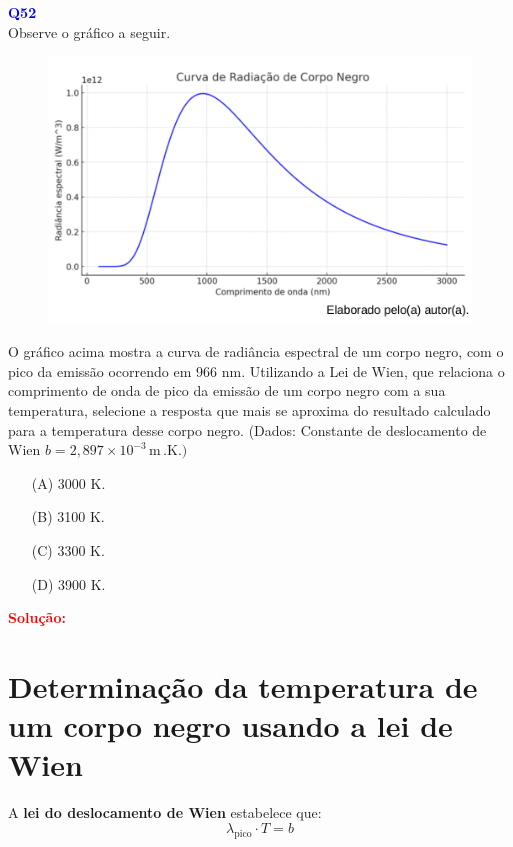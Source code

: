 \documentclass[a4paper,12pt]{article}
\begin{document}
\begin{flushleft}
\textbf{\textcolor{blue}{\Large Q52}}\\
\noindent
Observe o gráfico a seguir.

\begin{figure}[h]
\centering
\includegraphics[scale=0.5]{figures/radiacaocorponegro.png}
\end{figure}

O gráfico acima mostra a curva de radiância espectral de um
corpo negro, com o pico da emissão ocorrendo em 966 nm.
Utilizando a Lei de Wien, que relaciona o comprimento de
onda de pico da emissão de um corpo negro com a sua
temperatura, selecione a resposta que mais se aproxima do
resultado calculado para a temperatura desse corpo negro.
(Dados: Constante de deslocamento de Wien $b = 2{,}897 \times 10^{-3}\,\mathrm{m}\,.\mathrm{K}.)$

\begin{itemize}
\item[(A)] 3000 K.
\item[(B)] 3100 K.
\item[(C)] 3300 K.
\item[(D)] 3900 K.
\end{itemize}

\vspace{0.5cm}

\textcolor{red}{\textbf{Solução:}}\\

\section*{Determinação da temperatura de um corpo negro usando a lei de Wien}

A \textbf{lei do deslocamento de Wien} estabelece que:
\[
\lambda_{\text{pico}} \cdot T = b
\]


\end{flushleft}
\end{document}
